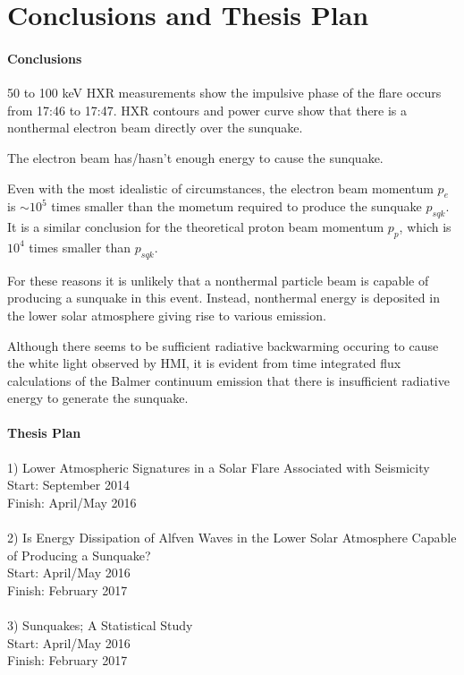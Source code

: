 \section{Conclusions and Thesis Plan}

\paragraph{Conclusions}
50 to 100 keV HXR measurements show the impulsive phase of the flare occurs from 17:46 to 17:47. HXR contours and power curve  show that there is a nonthermal electron beam directly over the sunquake. 

The electron beam has/hasn't enough energy to cause the sunquake.

Even with the most idealistic of circumstances, the electron beam momentum $p_e$ is $\sim 10^{5}$ times smaller than the mometum required to produce the sunquake $p_{sqk}$. It is a similar conclusion for the theoretical proton beam momentum $p_{p}$, which is $10^{4}$ times smaller than $p_{sqk}$.

For these reasons it is unlikely that a nonthermal particle beam is capable of producing a sunquake in this event. Instead, nonthermal energy is deposited in the lower solar atmosphere giving rise to various emission. 

Although there seems to be sufficient radiative backwarming occuring to cause the white light observed by HMI, it is evident from time integrated flux calculations of the Balmer continuum emission that there is insufficient radiative energy to generate the sunquake. 



\paragraph{Thesis Plan}
1) Lower Atmospheric Signatures in a Solar Flare Associated with Seismicity\\
Start: September 2014\\
Finish: April/May 2016\\

\\
2) Is Energy Dissipation of Alfven Waves in the Lower Solar Atmosphere Capable of Producing a Sunquake? \\
Start: April/May 2016\\
Finish: February 2017\\

\\
3) Sunquakes; A Statistical Study\\
Start: April/May 2016\\
Finish: February 2017\\


